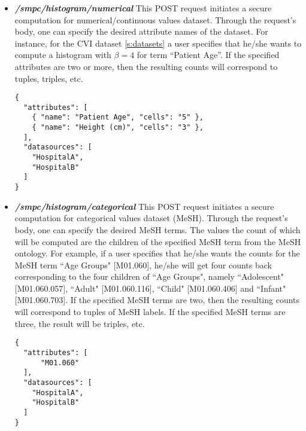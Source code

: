 \begin{itemize}
\item \textbf{\textit{/smpc/histogram/numerical}}
This POST request initiates a secure computation for numerical/continuous values dataset.
Through the request's body, one can specify the desired attribute names of the dataset.
For instance, for the CVI dataset \ref{s:datasets} a user specifies that he/she wants to compute a histogram with $\beta = 4$ for term ``Patient Age''.
If the specified attributes are two or more, then the resulting counts will correspond to tuples, triples, etc.

{
\begin{verbatim}
{
  "attributes": [
    { "name": "Patient Age", "cells": "5" },
    { "name": "Height (cm)", "cells": "3" },
  ],
  "datasources": [
    "HospitalA",
    "HospitalB"
  ]
}
\end{verbatim}
\label{sc:histogram-numerical-post}
}



\item \textbf{\textit{/smpc/histogram/categorical}}
This POST request initiates a secure computation for categorical values dataset (MeSH).
Through the request's body, one can specify the desired MeSH terms.
The values the count of which will be computed are the children of the specified MeSH term from the MeSH ontology.
For example, if a user specifies that he/she wants the counts for the MeSH term ``Age Groups" [M01.060], he/she will get four counts back corresponding to the four children of ``Age Groups", namely ``Adolescent" [M01.060.057], ``Adult" [M01.060.116], ``Child" [M01.060.406] and ``Infant" [M01.060.703].
If the specified MeSH terms are two, then the resulting counts will correspond to tuples of MeSH labels.
If the specified MeSH terms are three, the result will be triples, etc.

{
\begin{verbatim}
{
  "attributes": [
      "M01.060"
  ],
  "datasources": [
    "HospitalA",
    "HospitalB"
  ]
}
\end{verbatim}
\label{sc:histogram-categorical-post}
}




\end{itemize}
